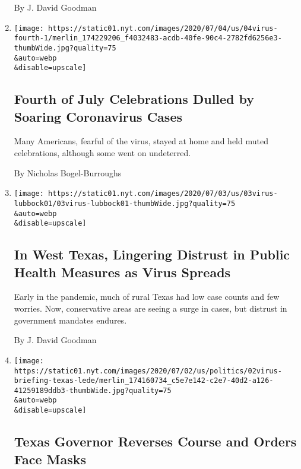 \begin{enumerate}
  By J. David Goodman
\item
  \href{/2020/07/04/us/july-fourth-celebrations-coronavirus.html}{}

  \texttt{[image: https://static01.nyt.com/images/2020/07/04/us/04virus-fourth-1/merlin\_174229206\_f4032483-acdb-40fe-90c4-2782fd6256e3-thumbWide.jpg?quality=75\\\&auto=webp\\\&disable=upscale]}

  \hypertarget{fourth-of-july-celebrations-dulled-by-soaring-coronavirus-cases}{%
  \subsection{Fourth of July Celebrations Dulled by Soaring Coronavirus
  Cases}\label{fourth-of-july-celebrations-dulled-by-soaring-coronavirus-cases}}

  Many Americans, fearful of the virus, stayed at home and held muted
  celebrations, although some went on undeterred.

  By Nicholas Bogel-Burroughs
\item
  \href{/2020/07/04/us/coronavirus-texas-lubbock.html}{}

  \texttt{[image: https://static01.nyt.com/images/2020/07/03/us/03virus-lubbock01/03virus-lubbock01-thumbWide.jpg?quality=75\\\&auto=webp\\\&disable=upscale]}

  \hypertarget{in-west-texas-lingering-distrust-in-public-health-measures-as-virus-spreads}{%
  \subsection{In West Texas, Lingering Distrust in Public Health
  Measures as Virus
  Spreads}\label{in-west-texas-lingering-distrust-in-public-health-measures-as-virus-spreads}}

  Early in the pandemic, much of rural Texas had low case counts and few
  worries. Now, conservative areas are seeing a surge in cases, but
  distrust in government mandates endures.

  By J. David Goodman
\item
  \href{/2020/07/02/us/coronavirus-texas-masks.html}{}

  \texttt{[image: https://static01.nyt.com/images/2020/07/02/us/politics/02virus-briefing-texas-lede/merlin\_174160734\_c5e7e142-c2e7-40d2-a126-41259189ddb3-thumbWide.jpg?quality=75\\\&auto=webp\\\&disable=upscale]}

  \hypertarget{texas-governor-reverses-course-and-orders-face-masks}{%
  \subsection{Texas Governor Reverses Course and Orders Face
  Masks}\label{texas-governor-reverses-course-and-orders-face-masks}}


\end{enumerate}
